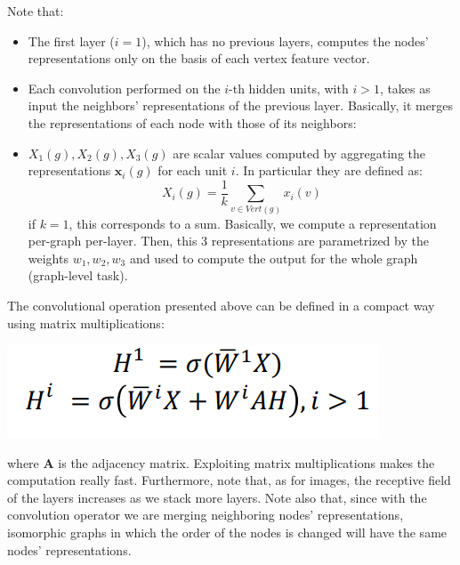 Note that:
\begin{itemize}
    \item The first layer ($i = 1$), which has no previous layers, computes the nodes' representations only on the basis of each vertex feature vector.

    \item Each convolution performed on the $i$-th hidden units, with $i > 1$, takes as input the neighbors' representations of the previous layer. Basically, it merges the representations of each node with those of its neighbors:

    \item $X_1(g), X_2(g), X_3(g)$ are scalar values computed by aggregating the representations $\textbf{x}_i(g)$ for each unit $i$.
    In particular they are defined as:
    \[X_i(g) = \frac{1}{k}\sum_{v \in Vert(g)}x_i(v)\]
    if $k = 1$, this corresponds to a sum. Basically, we compute a representation per-graph per-layer. Then, this 3 representations are parametrized by the weights $w_1, w_2, w_3$ and used to compute the output for the whole graph (graph-level task).
\end{itemize}
The convolutional operation presented above can be defined in a compact way using matrix multiplications:
\begin{center}
    \includegraphics[scale=0.6]{images/matrix-gcn.png}
\end{center}
where $\textbf{A}$ is the adjacency matrix. Exploiting matrix multiplications makes the computation really fast. Furthermore, note that, as for images, the receptive field of the layers increases as we stack more layers.\newline\newline
Note also that, since with the convolution operator we are merging neighboring nodes' representations, isomorphic graphs in which the order of the nodes is changed will have the same nodes' representations.

